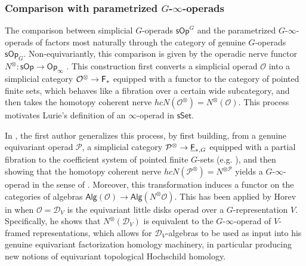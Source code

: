 \documentclass[a4paper,10pt
,draft
]{article}%
\numberwithin{equation}{section}
\numberwithin{figure}{section}
\theoremstyle{definition} %
\newcommand{\Fin}{\mathsf{F}}%
\newcommand{\Set}{\ensuremath{\mathsf{Set}}}
\newcommand{\sSet}{\ensuremath{\mathsf{sSet}}}%
\newcommand{\Op}{\mathsf{Op}}%
\newcommand{\sOp}{\ensuremath{\mathsf{sOp}}}%
\newcommand{\Alg}{\mathsf{Alg}}
\renewcommand{\O}{\ensuremath{\mathcal O}}
\renewcommand{\P}{\ensuremath{\mathcal P}}
\newcommand{\1}{\ensuremath{\mathbbm 1}}%
\begin{document}
\subsubsection*{Comparison with parametrized $G$-$\infty$-operads}

The comparison between simplicial $G$-operads $\sOp^G$ and the parametrized $G$-$\infty$-operads of \cite{BDGNS}
factors most naturally through the category of genuine $G$-operads $\sOp_G$.
Non-equivariantly, this comparison is given by
the operadic nerve functor $N^\otimes \colon \sOp \to \Op_\infty$ \cite[Def. 2.1.1.3]{Lu09}.
This construction first converts a simplicial operad $\O$ into
a simplicial category
$\O^\otimes \to \Fin_{\**}$
equipped with a functor to the category of pointed finite sets, which behaves like a fibration over a certain wide subcategory,
and then takes the homotopy coherent nerve
$hcN(\O^\otimes) = N^\otimes(\O)$.
This process motivates Lurie's definition of an $\infty$-operad in $\sSet$.

In \cite{BNerve}, the first author generalizes this process,
by first building, from a genuine equivariant operad $\P$, 
a simplicial category
$\P^{\otimes} \to \underline{\Fin}_{\**,G}$
equipped with a partial fibration to the coefficient system of pointed finite $G$-sets (e.g. \cite[Def. 3.3]{BNerve}),
and then showing that the homotopy coherent nerve $hcN(\P^{\otimes}) = N^{\otimes \P}$
yields a $G$-$\infty$-operad in the sense of \cite{BDGNS}.
Moreover, this transformation induces a functor on the categories of algebras $\Alg(\O) \to \Alg(N^{\otimes}\O)$.
%
This has been applied by Horev in \cite{Hor} when $\O = \mathcal D_V$ is the equivariant little disks operad over a $G$-representation $V$.
Specifically, he shows \cite[\S 3.9]{Hor} that $N^\otimes(\mathcal D_V)$ is equivalent to the
$G$-$\infty$-operad of $V$-framed representations,
which allows for $\mathcal D_V$-algebras to be used as input into his genuine equivariant factorization homology machinery,
in particular producing new notions of equivariant topological Hochschild homology.





\end{document}
